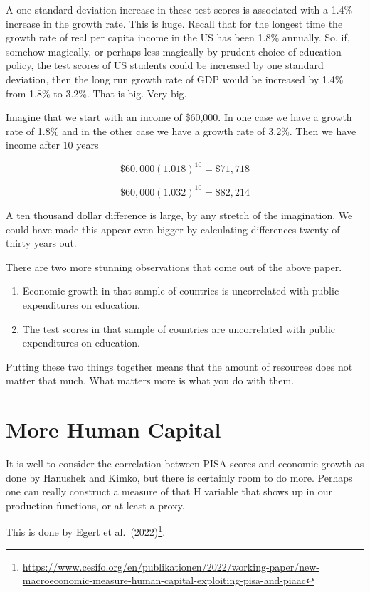 \documentclass[
]{book}
\providecommand{\tightlist}{%
  \setlength{\itemsep}{0pt}\setlength{\parskip}{0pt}}
\begin{document}
A one standard deviation increase in these test scores is associated with a 1.4\% increase in the growth rate. This is huge. Recall that for the longest time the growth rate of real per capita income in the US has been 1.8\% annually. So, if, somehow magically, or perhaps less magically by prudent choice of education policy, the test scores of US students could be increased by one standard deviation, then the long run growth rate of GDP would be increased by 1.4\% from 1.8\% to 3.2\%. That is big. Very big.

Imagine that we start with an income of \$60,000. In one case we have a growth rate of 1.8\% and in the other case we have a growth rate of 3.2\%. Then we have income after 10 years

\[\$60,000 (1.018)^{10} = \$71,718 \]

\[\$60,000 (1.032)^{10} = \$82,214\]

A ten thousand dollar difference is large, by any stretch of the imagination. We could have made this appear even bigger by calculating differences twenty of thirty years out.

There are two more stunning observations that come out of the above paper.

\begin{enumerate}
\def\labelenumi{\arabic{enumi}.}
\tightlist
\item
  Economic growth in that sample of countries is uncorrelated with public expenditures on education.
\item
  The test scores in that sample of countries are uncorrelated with public expenditures on education.
\end{enumerate}

Putting these two things together means that the amount of resources does not matter that much. What matters more is what you do with them.

\hypertarget{more-human-capital}{%
\section{More Human Capital}\label{more-human-capital}}

It is well to consider the correlation between PISA scores and economic growth as done by Hanushek and Kimko, but there is certainly room to do more. Perhaps one can really construct a measure of that H variable that shows up in our production functions, or at least a proxy.

This is done by Egert et al.~(2022)\footnote{\url{https://www.cesifo.org/en/publikationen/2022/working-paper/new-macroeconomic-measure-human-capital-exploiting-pisa-and-piaac}}.
\end{document}
